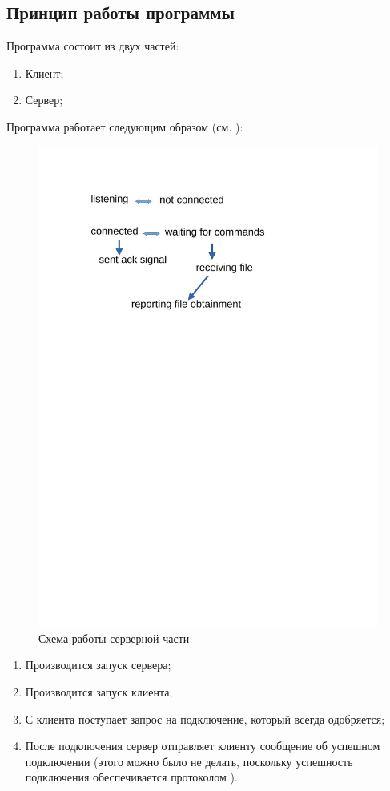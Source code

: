 \documentclass[../AISTR.tex]{subfiles}
\begin{document}
\subsection{Принцип работы программы}
Программа состоит из двух частей:
\begin{enumerate}
	\item Клиент;
	\item Сервер;
\end{enumerate}
Программа работает следующим образом (см. ): 

\begin{figure}[p]
	\centering
	\includegraphics[trim=70 555 195 80,clip,width=0.8\linewidth]{"../images/схема tcp"}
	\caption{Схема работы серверной части}
	\label{fig:tcp-server}
\end{figure}

\begin{enumerate}
	\item Производится запуск сервера;
	\item Производится запуск клиента;
	\item С клиента поступает запрос на подключение, который всегда одобряется;
	\item После подключения сервер отправляет клиенту сообщение об успешном подключении (этого можно было не делать, поскольку успешность подключения обеспечивается протоколом \tcp).
\end{enumerate}
\end{document}
